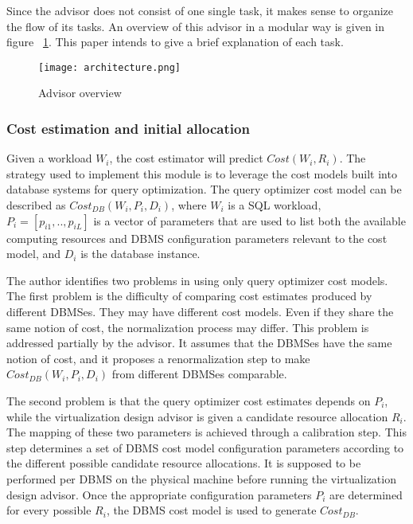 Since the advisor does not consist of one single task, it makes sense to organize the flow of its tasks. An overview of this advisor in a modular way is given in figure ~\ref{fig:architecture}. This paper intends to give a brief explanation of each task.


\begin{figure}[ht]
\centering
\texttt{[image: architecture.png]}
\caption{Advisor overview}
\label{fig:architecture}
\end{figure} 

\subsubsection{Cost estimation and initial allocation}
\label{subsec:cost}

Given a workload $W_{i}$, the cost estimator will predict $Cost(W_{i},R_{i})$. The strategy used to implement this module is to leverage the cost models built into database systems for query optimization. The query optimizer cost model can be described as $Cost_{DB}(W_{i},P_{i},D_{i})$, where $W_{i}$ is a SQL workload, $P_{i} = [p_{i1},..,p_{iL}]$ is a vector of parameters that are used to list both the available computing resources and DBMS configuration parameters relevant to the cost model, and $D_{i}$ is  the database instance. 

The author identifies two problems in using only query optimizer cost models. The first problem is the difficulty of comparing cost estimates produced by different DBMSes. They may have different cost models. Even if they share the same notion of cost, the normalization process may differ. This problem is addressed partially by the advisor. It assumes that the DBMSes have the same notion of cost, and it proposes a renormalization step to make $Cost_{DB}(W_{i},P_{i},D_{i})$ from different DBMSes comparable.%

The second problem is that the query optimizer cost estimates depends on $P_{i}$, while the virtualization design advisor is given a candidate resource allocation $R_{i}$. The mapping of these two parameters is achieved through a calibration step. This step determines a set of DBMS cost model configuration parameters according to the different possible candidate resource allocations. It is supposed to be performed per DBMS on the physical machine before running the virtualization design advisor. Once the appropriate configuration parameters $P_{i}$ are determined for every possible $R_{i}$, the DBMS cost model is used to generate $Cost_{DB}$.

